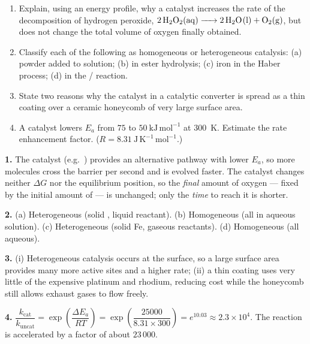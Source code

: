 \documentclass[11pt]{article}
\begin{document}
\begin{exercice}
\begin{enumerate}
\item Explain, using an energy profile, why a catalyst increases the rate of the decomposition of hydrogen peroxide, $\ce{2H2O2(aq) -> 2H2O(l) + O2(g)}$, but does not change the total volume of oxygen finally obtained.
\item Classify each of the following as homogeneous or heterogeneous catalysis: (a)  powder added to  solution; (b)  in ester hydrolysis; (c) iron in the Haber process; (d)  in the / reaction.
\item State two reasons why the catalyst in a catalytic converter is spread as a thin coating over a ceramic honeycomb of very large surface area.
\item A catalyst lowers $E_a$ from $75$ to $50\ \mathrm{kJ\,mol^{-1}}$ at \SI{300}{K}. Estimate the rate enhancement factor. ($R = 8.31\ \mathrm{J\,K^{-1}\,mol^{-1}}$.)
\end{enumerate}
\end{exercice}

\begin{corrige}[Exercise 1]
\textbf{1.} The catalyst (e.g.\ ) provides an alternative pathway with lower $E_a$, so more molecules cross the barrier per second and  is evolved faster. The catalyst changes neither $\Delta G$ nor the equilibrium position, so the \emph{final} amount of oxygen — fixed by the initial amount of  — is unchanged; only the \emph{time} to reach it is shorter.

\textbf{2.} (a) Heterogeneous (solid , liquid reactant). (b) Homogeneous (all in aqueous solution). (c) Heterogeneous (solid Fe, gaseous reactants). (d) Homogeneous (all aqueous).

\textbf{3.} (i) Heterogeneous catalysis occurs at the surface, so a large surface area provides many more active sites and a higher rate; (ii) a thin coating uses very little of the expensive platinum and rhodium, reducing cost while the honeycomb still allows exhaust gases to flow freely.

\textbf{4.} $\dfrac{k_{\text{cat}}}{k_{\text{uncat}}} = \exp\!\left(\dfrac{\Delta E_a}{RT}\right) = \exp\!\left(\dfrac{25000}{8.31\times300}\right) = e^{10.03} \approx 2.3\times10^{4}$. The reaction is accelerated by a factor of about $23\,000$.
\end{corrige}
\end{document}
